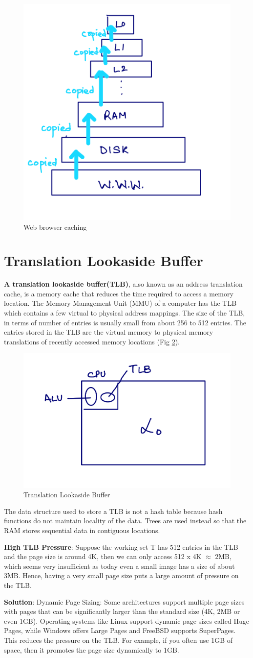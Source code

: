 \documentclass[twoside]{article}
\begin{document}
\begin{figure}[htp]
	\centering
  \includegraphics[width=0.3\linewidth]{Image-1-2.png}
  \caption{Web browser caching}
  \label{fig:www}
\end{figure}


\section{Translation Lookaside Buffer}

\textbf {A translation lookaside buffer(TLB)}, also known as an address translation cache, is a memory cache that reduces the time required to access a memory location. The Memory Management Unit (MMU) of a computer has the TLB which contains a few virtual to physical address mappings. The size of the TLB, in terms of number of entries is usually small from about 256 to 512 entries. The entries stored in the TLB are the virtual memory to physical memory translations of recently accessed memory locations (Fig \ref{fig:TLB}).

\begin{figure}[htp]
	\centering
  \includegraphics[width=0.3\linewidth]{Image-1-3.png}
  \caption{Translation Lookaside Buffer}
  \label{fig:TLB}
\end{figure}

The data structure used to store a TLB is not a hash table because hash functions do not maintain locality of the data. Trees are used instead so that the RAM stores sequential data in contiguous locations.

\textbf{High TLB Pressure}: 
Suppose the working set T has 512 entries in the TLB and the page size is around 4K, then we can only access 512 x 4K $\approx$ 2MB, which seems very insufficient as today even a small image has a size of about 3MB. Hence, having a very small page size puts a large amount of pressure on the TLB. 

\textbf{Solution}:
Dynamic Page Sizing: Some architectures support multiple page sizes with pages that can be significantly larger than the standard size (4K, 2MB or even 1GB). Operating systems like Linux support dynamic page sizes called Huge Pages, while Windows offers Large Pages and FreeBSD supports SuperPages. This reduces the pressure on the TLB. For example, if you often use 1GB of space, then it promotes the page size dynamically to 1GB.
\end{document}
